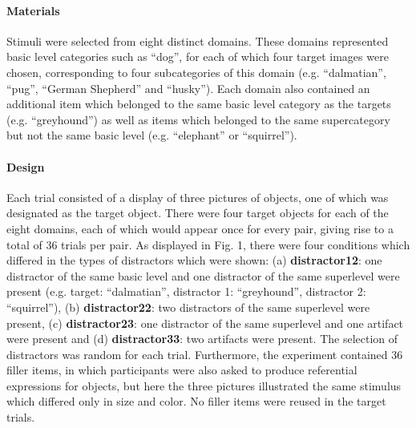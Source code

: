 \documentclass[10pt,letterpaper]{article}
\begin{document}
\paragraph{\bf Materials}
Stimuli were selected from eight distinct domains. These domains represented basic level categories such as ``dog'', for each of which four target images were chosen, corresponding to four subcategories of this domain (e.g. ``dalmatian'', ``pug'', ``German Shepherd'' and ``husky''). Each domain also contained an additional item which belonged to the same basic level category as the targets (e.g. ``greyhound'') as well as items which belonged to the same supercategory but not the same basic level (e.g. ``elephant'' or ``squirrel''). 

\paragraph{\bf Design}
Each trial consisted of a display of three pictures of objects, one of which was designated as the target object. There were four target objects for each of the eight domains, each of which would appear once for every pair, giving rise to a total of 36 trials per pair. As displayed in Fig. 1, there were four conditions which differed in the types of distractors which were shown: (a) \textbf{distractor12}: one distractor of the same basic level and one distractor of the same superlevel were present (e.g. target: ``dalmatian'', distractor 1: ``greyhound'', distractor 2: ``squirrel''), (b) \textbf{distractor22}: two distractors of the same superlevel were present, (c) \textbf{distractor23}: one distractor of the same superlevel and one artifact were present and (d) \textbf{distractor33}: two artifacts were present. The selection of distractors was random for each trial. Furthermore, the experiment contained 36 filler items, in which participants were also asked to produce referential expressions for objects, but here the three pictures illustrated the same stimulus which differed only in size and color. No filler items were reused in the target trials.
\end{document}
